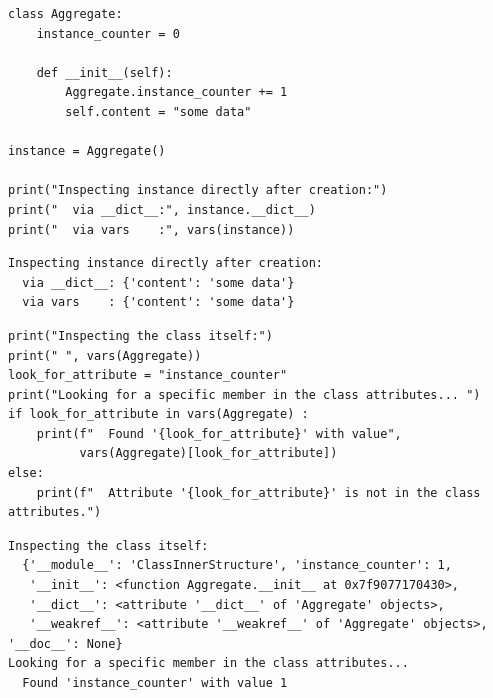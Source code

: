 \begin{frame}[fragile]
%
\begin{codebox}
\begin{verbatim}
class Aggregate:
    instance_counter = 0

    def __init__(self):
        Aggregate.instance_counter += 1
        self.content = "some data"

instance = Aggregate()

print("Inspecting instance directly after creation:")
print("  via __dict__:", instance.__dict__)
print("  via vars    :", vars(instance))
\end{verbatim}
\end{codebox}
%
\begin{cmdbox}
\begin{verbatim}
Inspecting instance directly after creation:
  via __dict__: {'content': 'some data'}
  via vars    : {'content': 'some data'}
\end{verbatim}
\end{cmdbox}
%
\end{frame}


\begin{frame}[fragile]
%
\begin{codebox}
\begin{verbatim}
print("Inspecting the class itself:")
print(" ", vars(Aggregate))
look_for_attribute = "instance_counter"
print("Looking for a specific member in the class attributes... ")
if look_for_attribute in vars(Aggregate) :
    print(f"  Found '{look_for_attribute}' with value",
          vars(Aggregate)[look_for_attribute])
else:
    print(f"  Attribute '{look_for_attribute}' is not in the class attributes.")
\end{verbatim}
\end{codebox}
%
\begin{cmdbox}
\begin{verbatim}
Inspecting the class itself:
  {'__module__': 'ClassInnerStructure', 'instance_counter': 1,
   '__init__': <function Aggregate.__init__ at 0x7f9077170430>, 
   '__dict__': <attribute '__dict__' of 'Aggregate' objects>, 
   '__weakref__': <attribute '__weakref__' of 'Aggregate' objects>, '__doc__': None}
Looking for a specific member in the class attributes... 
  Found 'instance_counter' with value 1
\end{verbatim}
\end{cmdbox}
%
\end{frame}

